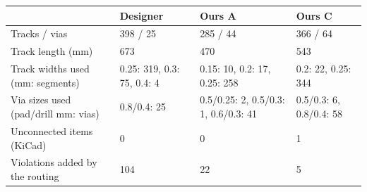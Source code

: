 \begin{tabular}{p{4.6cm}p{3.1cm}p{3.1cm}p{3.1cm}}
\toprule
 & Designer & Ours A & Ours C \\
\midrule
Tracks / vias & 398 / 25 & 285 / 44 & 366 / 64 \\
Track length (mm) & 673 & 470 & 543 \\
Track widths used (mm: segments) & 0.25: 319, 0.3: 75, 0.4: 4 & 0.15: 10, 0.2: 17, 0.25: 258 & 0.2: 22, 0.25: 344 \\
Via sizes used (pad/drill mm: vias) & 0.8/0.4: 25 & 0.5/0.25: 2, 0.5/0.3: 1, 0.6/0.3: 41 & 0.5/0.3: 6, 0.8/0.4: 58 \\
Unconnected items (KiCad) & 0 & 0 & 1 \\
Violations added by the routing & 104 & 22 & 5 \\
\bottomrule
\end{tabular}
